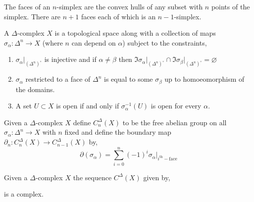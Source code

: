 \documentclass[12pt]{extarticle}
\begin{document}
\begin{definition}
The faces of an $n$-simplex are the convex hulls of any subset with $n$ points of the simplex. There are $n+1$ faces each of which is an $n-1$-simplex. 
\end{definition}

\begin{definition}
A $\Delta$-complex $X$ is a topological space along with a collection of maps $\sigma_\alpha : \Delta^n \to X$ (where $n$ can depend on $\alpha$) subject to the constraints,
\begin{enumerate}
\item $\sigma_\alpha|_{(\Delta^n)^\circ}$ is injective and if $\alpha \neq \beta$ then $\Im{\sigma_\alpha|_{(\Delta^n)^\circ}} \cap \Im{\sigma_\beta|_{(\Delta^n)^\circ}} = \varnothing$

\item $\sigma_\alpha$ restricted to a face of $\Delta^n$ is equal to some $\sigma_\beta$ up to homoeomorphism of the domains. 

\item A set $U \subset X$ is open if and only if $\sigma_\alpha^{-1}(U)$ is open for every $\alpha$. 
\end{enumerate}
\end{definition}

\begin{definition}
Given a $\Delta$-complex $X$ define $C^\Delta_n(X)$ to be the free abelian group on all $\sigma_\alpha : \Delta^n \to X$ with $n$ fixed and define the boundary map $\partial_n  : C^\Delta_n(X) \to C^\Delta_{n-1}(X)$ by, 
\[\partial(\sigma_\alpha) = \sum_{i = 0}^n (-1)^i \sigma_\alpha|_{i^{\mathrm{th}}-\text{face}} \]

\end{definition}

\begin{lemma}
Given a $\Delta$-complex $X$ the sequence $C^\Delta(X)$ given by,
\begin{center}
\end{center}
is a complex.
\end{lemma}
\end{document}

